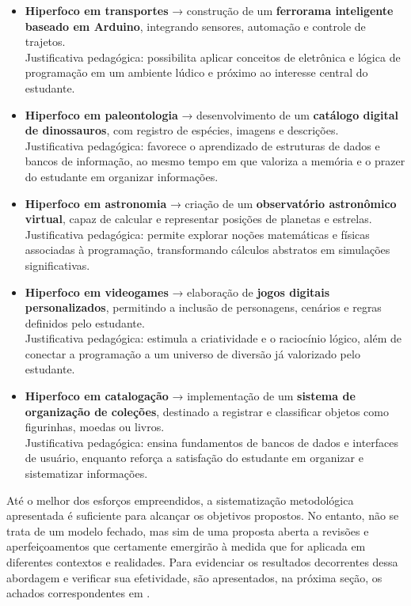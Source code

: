 \documentclass[
  12pt,
  a4paper,
]{article}
\begin{document}
\begin{itemize}
\item
  \textbf{Hiperfoco em transportes} → construção de um \textbf{ferrorama
  inteligente baseado em Arduino}, integrando sensores, automação e
  controle de trajetos.\\
  Justificativa pedagógica: possibilita aplicar conceitos de eletrônica
  e lógica de programação em um ambiente lúdico e próximo ao interesse
  central do estudante.
\item
  \textbf{Hiperfoco em paleontologia} → desenvolvimento de um
  \textbf{catálogo digital de dinossauros}, com registro de espécies,
  imagens e descrições.\\
  Justificativa pedagógica: favorece o aprendizado de estruturas de
  dados e bancos de informação, ao mesmo tempo em que valoriza a memória
  e o prazer do estudante em organizar informações.
\item
  \textbf{Hiperfoco em astronomia} → criação de um \textbf{observatório
  astronômico virtual}, capaz de calcular e representar posições de
  planetas e estrelas.\\
  Justificativa pedagógica: permite explorar noções matemáticas e
  físicas associadas à programação, transformando cálculos abstratos em
  simulações significativas.
\item
  \textbf{Hiperfoco em videogames} → elaboração de \textbf{jogos
  digitais personalizados}, permitindo a inclusão de personagens,
  cenários e regras definidos pelo estudante.\\
  Justificativa pedagógica: estimula a criatividade e o raciocínio
  lógico, além de conectar a programação a um universo de diversão já
  valorizado pelo estudante.
\item
  \textbf{Hiperfoco em catalogação} → implementação de um
  \textbf{sistema de organização de coleções}, destinado a registrar e
  classificar objetos como figurinhas, moedas ou livros.\\
  Justificativa pedagógica: ensina fundamentos de bancos de dados e
  interfaces de usuário, enquanto reforça a satisfação do estudante em
  organizar e sistematizar informações.
\end{itemize}

Até o melhor dos esforços empreendidos, a sistematização metodológica
apresentada é suficiente para alcançar os objetivos propostos. No
entanto, não se trata de um modelo fechado, mas sim de uma proposta
aberta a revisões e aperfeiçoamentos que certamente emergirão à medida
que for aplicada em diferentes contextos e realidades. Para evidenciar
os resultados decorrentes dessa abordagem e verificar sua efetividade,
são apresentados, na próxima seção, os achados correspondentes em
.
\end{document}
